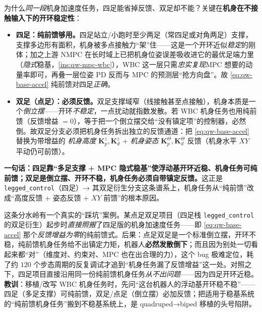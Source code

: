 \begin{insight}\label{ins:qw-base-feedforward}
为什么\emph{同一段}机身加速度任务，四足能省掉反馈、双足却不能？关键在\textbf{机身在不接触输入下的开环稳定性}：
\begin{itemize}
  \item \textbf{四足：纯前馈够用。}四足站立/小跑时至少两足（常四足或对角两足）支撑，支撑多边形有面积，机身被多点接触力“架”住——这是一个开环近似\emph{稳定}的刚体；加之上游 NMPC 在长时域上已把机身位姿误差吸收进它的最优足端力里（\emph{隐式}稳基，\cref{ins:qw-mpc-wbc}），WBC 这一层只需\emph{忠实复现}MPC 想要的动量率即可，再叠一层位姿 PD 反而与 MPC 的预测层“抢方向盘”。故 \cref{eq:qw-base-accel} 纯前馈对四足\emph{正确}。
  \item \textbf{双足（点足）：必须反馈。}双足支撑域窄（线接触甚至点接触），机身本质是一个\emph{倒立摆}——开环\emph{不稳定}，一点扰动就指数发散。若 WBC 机身任务也用纯前馈（反馈增益 $=0$），等于把一个倒立摆交给“没有镇定项”的控制器，必然倒。故双足分支必须把机身任务拆出独立的反馈通道：把 \cref{eq:qw-base-accel} 替换为带增益的 \emph{机身高度} $\boldsymbol{K}_p^z,\boldsymbol{K}_d^z$ + \emph{机身姿态} $\boldsymbol{K}_p^\Theta,\boldsymbol{K}_d^\Theta$ 反馈（机身水平 $XY$ 平动仍可前馈）。
\end{itemize}
\textbf{一句话：四足靠“多足支撑 + MPC 隐式稳基”使浮动基开环近稳、机身任务可纯前馈；双足是倒立摆、开环不稳，机身任务必须自带镇定反馈。}这正是 \texttt{legged\_control}（四足）→ 其双足衍生分支这条谱系上，机身任务从“纯前馈”改成“高度反馈 + 姿态反馈 + $XY$ 前馈”的根本原因。
\end{insight}

\begin{pitfall}
这条分水岭有一个真实的“踩坑”案例。某点足双足项目（四足栈 \texttt{legged\_control} 的双足衍生）起步时\emph{直接照搬}了四足版的机身加速度任务——即 \cref{eq:qw-base-accel} 那个\emph{反馈增益为零}的纯前馈式。后果：点足双足是一个标准倒立摆，开环不稳，纯前馈机身任务给不出镇定力矩，机器人\textbf{必然发散倒下}；而且因为别处一切看起来都“对”（维度对、约束对、MPC 也在出合理的力），这个 bug 极难定位，耗了约 $120$ 个步态周期的反复调试才追到“机身任务漏了反馈增益”这一处。对照之下，四足项目直接沿用同一份纯前馈机身任务\emph{从不出问题}——因为四足开环近稳。\textbf{教训}：移植/改写 WBC 机身任务时，先问“这台机器人的浮动基开环稳不稳”——四足（多足支撑）可纯前馈，双足/点足（倒立摆）必加反馈；把适用于稳基系统的“纯前馈机身任务”搬到不稳基系统上，是 quadruped→biped 移植的头号陷阱。
\end{pitfall}


